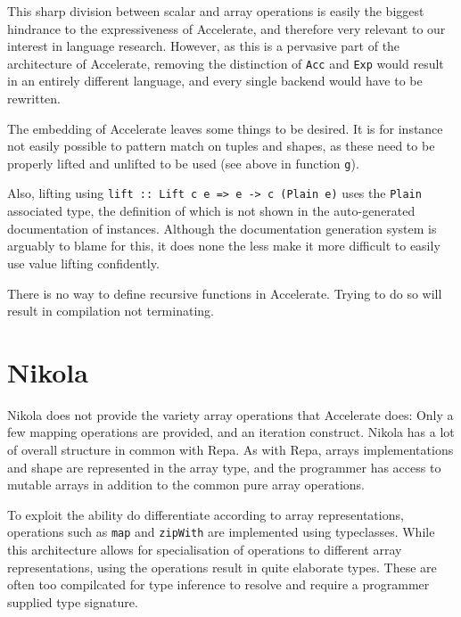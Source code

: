 
This sharp division between scalar and array operations is easily the biggest
hindrance to the expressiveness of Accelerate, and therefore very relevant to
our interest in language research. However, as this is a pervasive part of the
architecture of Accelerate, removing the distinction of \texttt{Acc} and
\texttt{Exp} would result in an entirely different language, and every single
backend would have to be rewritten.


The embedding of Accelerate leaves some things to be desired. It is for
instance not easily possible to pattern match on tuples and shapes, as these
need to be properly lifted and unlifted to be used (see above in function \texttt{g}).

Also, lifting using \texttt{lift :: Lift c e => e -> c (Plain e)} uses the
\texttt{Plain} associated type, the definition of which is not shown in the
auto-generated documentation of instances. Although the documentation
generation system is arguably to blame for this, it does none the less make it
more difficult to easily use value lifting confidently.

There is no way to define recursive functions in Accelerate. Trying to do so
will result in compilation not terminating.

\section{Nikola}

Nikola does not provide the variety array operations that Accelerate does: Only
a few mapping operations are provided, and an iteration construct.  Nikola has
a lot of overall structure in common with Repa. As with Repa, arrays
implementations and shape are represented in the array type, and the programmer
has access to mutable arrays in addition to the common pure array operations.

To exploit the ability do differentiate according to array representations,
operations such as \texttt{map} and \texttt{zipWith} are implemented using
typeclasses.  While this architecture allows for specialisation of operations
to different array representations, using the operations result in quite
elaborate types. These are often too compilcated for type inference to resolve
and require a programmer supplied type signature.


